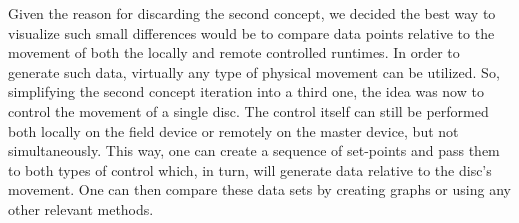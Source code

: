Given the reason for discarding the second concept, we decided the best way to visualize such small differences would be to compare data points relative to the movement of both the locally and remote controlled runtimes.
In order to generate such data, virtually any type of physical movement can be utilized.
So, simplifying the second concept iteration into a third one, the idea was now to control the movement of a single disc.
The control itself can still be performed both locally on the field device or remotely on the master device, but not simultaneously.
This way, one can create a sequence of set-points and pass them to both types of control which, in turn, will generate data relative to the disc's movement.
One can then compare these data sets by creating graphs or using any other relevant methods.
